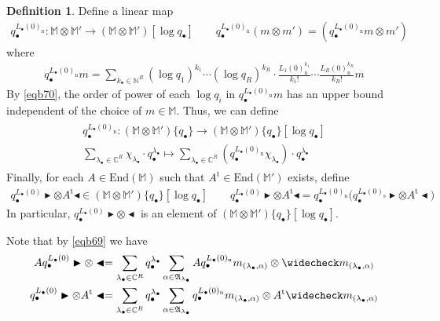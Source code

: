 \documentclass[11pt,b5paper,notitlepage]{article}
\theoremstyle{definition}
\newtheorem{df}{Definition}[section]
\theoremstyle{plain}
\newcommand{\fk}{\mathfrak}
\newcommand{\wch}{\widecheck}
\newcommand{\tr}{\mathrm{t}} %
\newcommand{\End}{\mathrm{End}} %
\newcommand{\blt}{\bullet}
\newcommand{\Mbb}{\mathbb M}
\newcommand{\Cbb}{\mathbb C}
\newcommand{\Nbb}{\mathbb N}
\newcommand{\btl}{\blacktriangleleft}
\newcommand{\btr}{\blacktriangleright}
\newcommand{\<}{\left\langle}
\renewcommand{\>}{\right\rangle}
\newcommand{\Lbni}{{L_\bullet(0)_\mathrm{n}}}
\newcommand{\Lbss}{{L_\bullet(0)_\mathrm{s}}}
\numberwithin{equation}{section}
\begin{document}
\begin{df}
Define a linear map
\begin{gather*}
q_\blt^{\Lbni}:\Mbb\otimes\Mbb'\rightarrow(\Mbb\otimes\Mbb')[\log q_\blt] \qquad q_\blt^{\Lbni}(m\otimes m')=(q_\blt^{\Lbni}m\otimes m')
\end{gather*}
where
\begin{align*}
q_\blt^{\Lbni}m=\sum_{k_\blt\in\Nbb^R}(\log q_1)^{k_1}\cdots(\log q_R)^{k_R}\cdot\frac{L_1(0)_{\mathrm n}^{k_1}}{k_1!}\cdots\frac{L_R(0)_{\mathrm n}^{k_R}}{k_R!} m
\end{align*}
By \eqref{eqb70}, the order of power of each $\log q_i$ in $q_\blt^{\Lbni}m$ has an upper bound independent of the choice of $m\in\Mbb$. Thus, we can define
\begin{gather}\label{eqb71}
\begin{gathered}
q_\blt^{\Lbni}:(\Mbb\otimes\Mbb')\{q_\blt\}\rightarrow (\Mbb\otimes\Mbb')\{q_\blt\}[\log q_\blt]\\[0.5ex] \sum_{\lambda_\blt\in\Cbb^R}\chi_{\lambda_\blt}\cdot q_\blt^{\lambda_\blt}\mapsto \sum_{\lambda_\blt\in\Cbb^R}(q_\blt^{\Lbni}\chi_{\lambda_\blt})\cdot q_\blt^{\lambda_\blt}
\end{gathered}
\end{gather}
Finally, for each $A\in\End(\Mbb)$ such that $A^\tr\in\End(\Mbb')$ exists, define
\begin{gather*}
q_\blt^{L_\blt(0)} \btr\otimes A^\tr\btl\in(\Mbb\otimes\Mbb')\{q_\blt\}[\log q_\blt]\qquad q_\blt^{L_\blt(0)} \btr\otimes A^\tr\btl=q_\blt^{\Lbni}\big(q_\blt^{\Lbss}\btr\otimes A^\tr\btl\big)
\end{gather*}
In particular, $q_\blt^{L_\blt(0)} \btr\otimes\btl$ is an element of $(\Mbb\otimes\Mbb')\{q_\blt\}[\log q_\blt]$. 
\end{df}

Note that by \eqref{eqb69} we have
\begin{subequations}\label{eqb73}
\begin{gather}
Aq_\blt^{L_\blt(0)} \btr\otimes\btl=\sum_{\lambda_\blt\in\Cbb^R}q_\blt^{\lambda_\blt}\sum_{\alpha\in\fk A_{\lambda_\blt}} Aq_\blt^{\Lbni}m_{(\lambda_\blt,\alpha)}\otimes \wch m_{(\lambda_\blt,\alpha)}\\
q_\blt^{L_\blt(0)} \btr\otimes A^\tr\btl=\sum_{\lambda_\blt\in\Cbb^R}q_\blt^{\lambda_\blt}\sum_{\alpha\in\fk A_{\lambda_\blt}} q_\blt^{\Lbni}m_{(\lambda_\blt,\alpha)}\otimes A^\tr \wch m_{(\lambda_\blt,\alpha)}
\end{gather}
\end{subequations}
\end{document}
